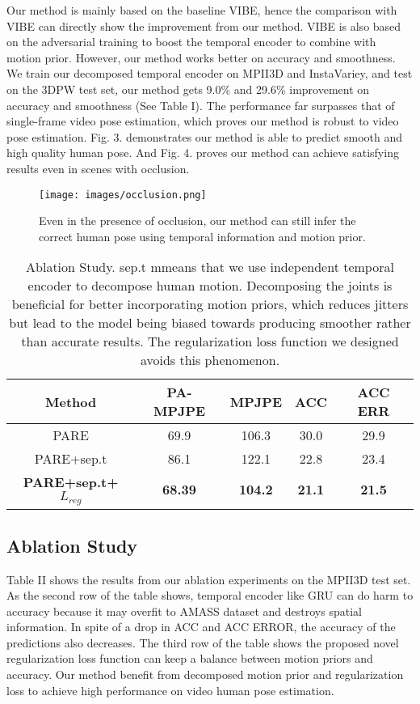 \documentclass{svproc}
\begin{document}
Our method is mainly based on the baseline VIBE, hence the comparison with VIBE can directly show the improvement from our method. VIBE is also based on the adversarial training to boost the temporal encoder to combine with motion prior. However, our method works better on accuracy and smoothness. We train our decomposed temporal encoder on MPII3D and InstaVariey, and test on the 3DPW test set, our method gets 9.0\% and 29.6\% improvement on accuracy and smoothness (See Table I). The performance far surpasses that of single-frame video pose estimation, which proves our method is robust to video pose estimation. Fig. 3. demonstrates our method is able to predict smooth and high quality human pose. And Fig. 4. proves our method can achieve satisfying results even in scenes with occlusion.
\begin{figure}
    \centering
    \centerline{\texttt{[image: images/occlusion.png]}}
    \caption{Even in the presence of occlusion, our method can still infer the correct human pose using temporal information and motion prior.}
\end{figure}

\begin{table} 
\centering
\caption{Ablation Study. sep.t mmeans that we use independent temporal encoder to decompose human motion.  Decomposing the joints is beneficial for better incorporating motion priors, which reduces jitters but lead to the model being biased towards producing smoother rather than accurate results. The regularization loss function we designed avoids this phenomenon.}
\label{table}
\small
\setlength{\tabcolsep}{3pt}
\begin{tabular}{|c|c|c|c|c|}
\hline
Method& 
PA-MPJPE& 
MPJPE&
ACC&
ACC ERR\\
\hline
PARE& 
69.9&
106.3&
30.0&
29.9\\
\hline
PARE+sep.t& 
86.1&
122.1&
22.8&
23.4\\
\hline
\textbf{PARE+sep.t+$L_{reg}$}& 
\textbf{68.39}&
\textbf{104.2}&
\textbf{21.1}&
\textbf{21.5}\\
\hline
\end{tabular}
\label{tab1}
\end{table}




\subsection{Ablation Study}

Table II shows the results from our ablation experiments on the MPII3D test set. As the second row of the table shows, temporal encoder like GRU can do harm to accuracy because it may overfit to AMASS dataset and destroys spatial information. In spite of a drop in ACC and ACC ERROR, the accuracy of the predictions also decreases. The third row of the table shows the proposed novel regularization loss function can keep a balance between motion priors and accuracy. Our method benefit from decomposed motion prior and regularization loss to achieve high performance on video human pose estimation. 
\end{document}
